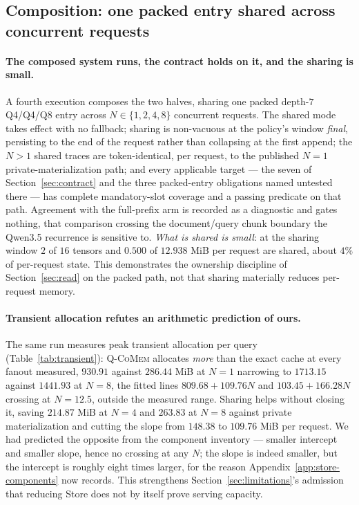 \documentclass{article}
\newcommand{\qcomem}{\textsc{Q-CoMem}}
\begin{document}
\subsection{Composition: one packed entry shared across concurrent requests}
\label{sec:composition}

\paragraph{The composed system runs, the contract holds on it, and the sharing
is small.}
A fourth execution composes the two halves, sharing one packed depth-$7$
Q4/Q4/Q8 entry across $N\in\{1,2,4,8\}$ concurrent requests.  The shared mode
takes effect with no fallback; sharing is non-vacuous at
the policy's window \emph{final}, persisting to the end of the request rather
than collapsing at the first append; the $N>1$ shared traces are
token-identical, per request, to the published $N=1$ private-materialization
path; and every applicable target --- the seven of Section~\ref{sec:contract}
and the three packed-entry obligations named untested there --- has complete
mandatory-slot coverage and a passing predicate on that path.  Agreement with
the full-prefix arm is recorded as a diagnostic and gates nothing, that
comparison crossing the document/query chunk boundary the Qwen3.5 recurrence is
sensitive to.  \emph{What is shared is small}: at the sharing
window $2$ of $16$ tensors and $0.500$ of $12.938$ MiB per request are shared,
about $4\%$ of per-request state.  This demonstrates the ownership discipline of
Section~\ref{sec:read} on the packed path, not that sharing materially reduces
per-request memory.

\paragraph{Transient allocation refutes an arithmetic prediction of ours.}
The same run measures peak transient allocation per query
(Table~\ref{tab:transient}): \qcomem{} allocates \emph{more} than the exact cache
at every fanout measured, $930.91$ against $286.44$ MiB at $N=1$ narrowing to
$1713.15$ against $1441.93$ at $N=8$, the fitted lines $809.68+109.76N$ and
$103.45+166.28N$ crossing at $N=12.5$, outside the measured range.  Sharing helps
without closing it, saving $214.87$ MiB at $N=4$ and $263.83$ at $N=8$ against
private materialization and cutting the slope from $148.38$ to $109.76$ MiB per
request.  We had predicted the opposite from the component inventory ---
smaller intercept and smaller slope, hence no crossing at any $N$; the slope is
indeed smaller, but the intercept is roughly eight times larger, for the reason
Appendix~\ref{app:store-components} now records.  This strengthens
Section~\ref{sec:limitations}'s admission that reducing Store does not by itself
prove serving capacity.
\end{document}
